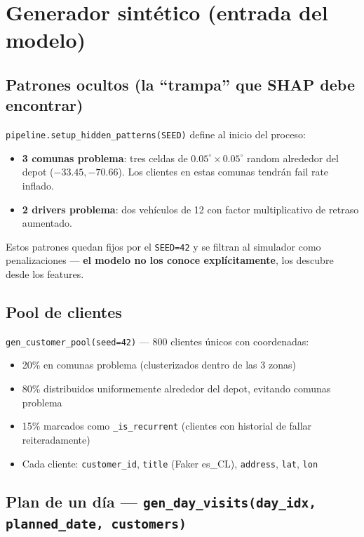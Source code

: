 \documentclass[11pt,a4paper]{article}
\begin{document}
\section{Generador sintético (entrada del modelo)}

\subsection{Patrones ocultos (la ``trampa'' que SHAP debe encontrar)}

\texttt{pipeline.setup\_hidden\_patterns(SEED)} define al inicio del proceso:

\begin{itemize}
  \item \textbf{3 comunas problema}: tres celdas de $0.05^{\circ} \times 0.05^{\circ}$ random alrededor del depot ($-33.45, -70.66$). Los clientes en estas comunas tendrán fail rate inflado.
  \item \textbf{2 drivers problema}: dos vehículos de 12 con factor multiplicativo de retraso aumentado.
\end{itemize}

Estos patrones quedan fijos por el \texttt{SEED=42} y se filtran al simulador como penalizaciones --- \textbf{el modelo no los conoce explícitamente}, los descubre desde los features.

\subsection{Pool de clientes}

\texttt{gen\_customer\_pool(seed=42)} --- 800 clientes únicos con coordenadas:

\begin{itemize}
  \item 20\% en comunas problema (clusterizados dentro de las 3 zonas)
  \item 80\% distribuidos uniformemente alrededor del depot, evitando comunas problema
  \item 15\% marcados como \texttt{\_is\_recurrent} (clientes con historial de fallar reiteradamente)
  \item Cada cliente: \texttt{customer\_id}, \texttt{title} (Faker es\_CL), \texttt{address}, \texttt{lat}, \texttt{lon}
\end{itemize}

\subsection{Plan de un día --- \texttt{gen\_day\_visits(day\_idx, planned\_date, customers)}}
\end{document}
